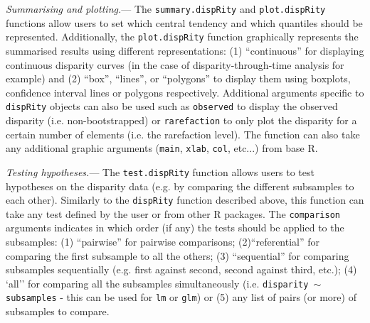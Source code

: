 \documentclass[12pt,letterpaper]{article}
\renewcommand{\subsubsection}[1]{%
\vspace{2ex}
\noindent
\textit{#1.}---}
\newcommand{\disp}{\texttt{dispRity} }
\begin{document}
\subsubsection{Summarising and plotting}
The \texttt{summary.dispRity} and \texttt{plot.dispRity} functions allow users to set which central tendency and which quantiles should be represented.
Additionally, the \texttt{plot.dispRity} function graphically represents the summarised results using different representations: (1) ``continuous'' for displaying continuous disparity curves (in the case of disparity-through-time analysis for example) and (2) ``box'', ``lines'', or ``polygons'' to display them using boxplots, confidence interval lines or polygons respectively.
Additional arguments specific to \disp objects can also be used such as \texttt{observed} to display the observed disparity (i.e. non-bootstrapped) or \texttt{rarefaction} to only plot the disparity for a certain number of elements (i.e. the rarefaction level).
The function can also take any additional graphic arguments (\texttt{main}, \texttt{xlab}, \texttt{col}, etc...) from base R.

\subsubsection{Testing hypotheses}
The \texttt{test.dispRity} function allows users to test hypotheses on the disparity data (e.g. by comparing the different subsamples to each other).
Similarly to the \disp function described above, this function can take any test defined by the user or from other R packages.
The \texttt{comparison} arguments indicates in which order (if any) the tests should be applied to the subsamples: (1) ``pairwise'' for pairwise comparisons; (2)``referential'' for comparing the first subsample to all the others; (3) ``sequential'' for comparing subsamples sequentially (e.g. first against second, second against third, etc.); (4) `all'' for comparing all the subsamples simultaneously (i.e. \texttt{disparity $\mathtt{\sim}$ subsamples} - this can be used for \texttt{lm} or \texttt{glm}) or (5) any list of pairs (or more) of subsamples to compare.
\end{document}
